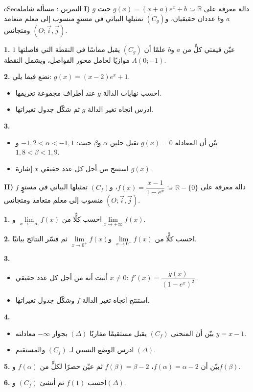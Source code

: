 \documentclass[12pt,a4paper]{article}
\newenvironment{BOX}[2]{\begin{otherlanguage}{english}\begin{arbox}{#1}{#2}}{\end{arbox}\end{otherlanguage}}
\newcounter{exo}
\newenvironment{tamrin}[1]{\stepcounter{exo}\begin{BOX}{cSec}{التمرين \theexo: #1}}{\end{BOX}}
\newcommand{\R}{\mathbb{R}}
\newenvironment{sq}{\begin{itemize}[leftmargin=2.4em,itemsep=3pt]}{\end{itemize}}
\newcommand{\qa}{\item[(أ)]}\newcommand{\qb}{\item[(ب)]}\newcommand{\qc}{\item[(جـ)]}\newcommand{\qd}{\item[(د)]}\newcommand{\qe}{\item[(هـ)]}
\newcommand{\QQ}[1]{\par\smallskip\textbf{#1.} }
\begin{document}
\begin{tamrin}{مسألة شاملة}
\textbf{I)} $g$ دالة معرفة على $\R$ بـ: $g(x)=(x+a)e^{x}+b$ حيث $a$ و$b$ عددان حقيقيان، و$(C_g)$ تمثيلها البياني في مستوٍ منسوب إلى معلم متعامد ومتجانس $(O;\vec i,\vec j)$.
\QQ{1} عيّن قيمتي كلٍّ من $a$ و$b$ علمًا أن $(C_g)$ يقبل مماسًا في النقطة التي فاصلتها $1$ موازيًا لحامل محور الفواصل، ويشمل النقطة $A(0;-1)$.
\QQ{2} نضع فيما يلي: $g(x)=(x-2)e^{x}+1$.
\begin{sq}
\qa احسب نهايات الدالة $g$ عند أطراف مجموعة تعريفها.
\qb ادرس اتجاه تغير الدالة $g$ ثم شكّل جدول تغيراتها.
\end{sq}
\QQ{3}
\begin{sq}
\qa بيّن أن المعادلة $g(x)=0$ تقبل حلين $\alpha$ و$\beta$ حيث: $-1{,}2<\alpha<-1{,}1$ و$1{,}8<\beta<1{,}9$.
\qb استنتج من أجل كل عدد حقيقي $x$ إشارة $g(x)$.
\end{sq}

\textbf{II)} $f$ دالة معرفة على $\R-\{0\}$ بـ: $f(x)=\dfrac{x-1}{1-e^{x}}$، و$(C_f)$ تمثيلها البياني في مستوٍ منسوب إلى معلم متعامد ومتجانس $(O;\vec i,\vec j)$.
\QQ{1} احسب كلًّا من $\lim\limits_{x\to-\infty}f(x)$ و$\lim\limits_{x\to+\infty}f(x)$.
\QQ{2} احسب كلًّا من $\lim\limits_{x\to0^{-}}f(x)$ و$\lim\limits_{x\to0^{+}}f(x)$ ثم فسّر النتائج بيانيًا.
\QQ{3}
\begin{sq}
\qa أثبت أنه من أجل كل عدد حقيقي $x\neq0$: $f'(x)=\dfrac{g(x)}{\left(1-e^{x}\right)^2}$.
\qb استنتج اتجاه تغير الدالة $f$ وشكّل جدول تغيراتها.
\end{sq}
\QQ{4}
\begin{sq}
\qa بيّن أن المنحنى $(C_f)$ يقبل مستقيمًا مقاربًا $(\Delta)$ بجوار $-\infty$ معادلته $y=x-1$.
\qb ادرس الوضع النسبي لـ $(C_f)$ والمستقيم $(\Delta)$.
\end{sq}
\QQ{5} بيّن أن $f(\alpha)=\alpha-2$، $f(\beta)=\beta-2$ ثم عيّن حصرًا لكلٍّ من $f(\alpha)$ و$f(\beta)$.
\QQ{6} احسب $f(1)$ ثم أنشئ $(C_f)$ و$(\Delta)$.
\end{tamrin}
\end{document}
